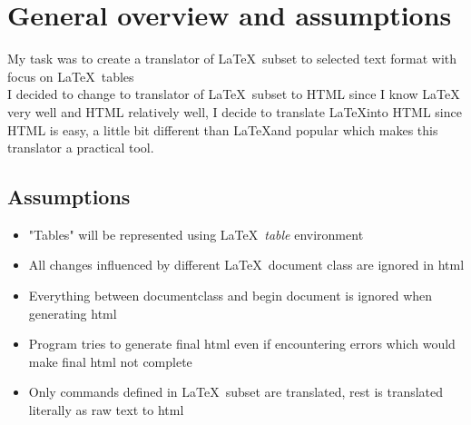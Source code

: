 \section{General overview and assumptions}
My task was to create a translator of \LaTeX \, subset to selected text format with focus on \LaTeX \, tables \\ 
I decided to change to translator of \LaTeX \, subset to HTML since I know \LaTeX \, very well and HTML relatively well, I decide to translate \LaTeX into HTML since HTML is easy, a little bit different than \LaTeX and popular which makes this translator a practical tool.
\subsection{Assumptions}
\begin{itemize}
    \item "Tables" will be represented using \LaTeX \, \emph{table} environment 
    \item All changes influenced by different \LaTeX \, document class are ignored in html 
    \item Everything between documentclass and begin document is ignored when generating html
    \item Program tries to generate final html even if encountering errors which would make final html not complete
    \item Only commands defined in \LaTeX \, subset are translated, rest is translated literally as raw text to html
\end{itemize}
